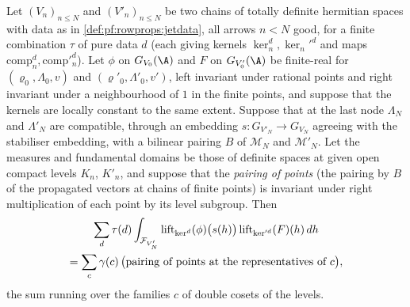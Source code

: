 \begin{lemma}[Gluing]\label{pf:rowprops:glue}
Let $(V_n)_{n\le N}$ and $(V'_n)_{n\le N}$ be two chains of totally definite hermitian spaces with data as in
\cref{def:pf:rowprops:jetdata}, all arrows $n<N$ good, for a finite combination $\tau$ of pure data $d$ (each giving kernels
$\ker_n^d,\ker_n'^d$ and maps $\mathrm{comp}^d_n,\mathrm{comp}'^d_n$). Let $\phi$ on $G_{V_0}(\A)$ and $F$ on $G_{V'_0}(\A)$ be
finite-real for $(\varrho_0,\Lambda_0,v)$ and $(\varrho'_0,\Lambda'_0,v')$, left invariant under rational points and right
invariant under a neighbourhood of $1$ in the finite points, and suppose that the kernels are locally constant to the
same extent. Suppose that at the last node $\Lambda_N$ and $\Lambda'_N$ are compatible, through an embedding
$s:G_{V'_N}\to G_{V_N}$ agreeing with the stabiliser embedding, with a bilinear pairing $B$ of $\mathcal M_N$ and
$\mathcal M'_N$. Let the measures and fundamental domains be those of definite spaces at given open compact levels
$K_n$, $K'_n$, and suppose that the \emph{pairing of points} (the pairing by $B$ of the propagated vectors at chains of
finite points) is invariant under right multiplication of each point by its level subgroup. Then
\begin{multline*}
\sum_d\tau(d)\int_{\mathcal{F}_{V'_N}}\mathrm{lift}_{\ker^d}(\phi)\bigl(s(h)\bigr)\,\mathrm{lift}_{\ker'^d}(F)(h)\,dh\\
=\sum_{c}\gamma(c)\,\bigl(\text{pairing of points at the representatives of }c\bigr),
\end{multline*}
the sum running over the families $c$ of double cosets of the levels.
\end{lemma}

